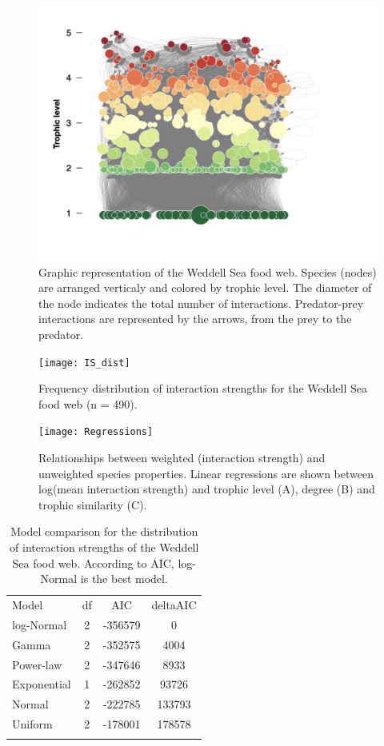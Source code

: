 \documentclass[gc, manuscript]{copernicus}
\begin{document}
\begin{figure}
\includegraphics[width=12cm]{WeddellSea_net} \caption{Graphic representation of the Weddell Sea food web. Species (nodes) are arranged verticaly and colored by trophic level. The diameter of the node indicates the total number of interactions. Predator-prey interactions are represented by the arrows, from the prey to the predator.}\label{fig:unnamed-chunk-3}
\end{figure}

\clearpage

\begin{figure}
\texttt{[image: IS\_dist]} \caption{Frequency distribution of interaction strengths for the Weddell Sea food web (n = 490).}\label{fig:unnamed-chunk-4}
\end{figure}

\clearpage

\begin{figure}
\texttt{[image: Regressions]} \caption{Relationships between weighted (interaction strength) and unweighted species properties. Linear regressions are shown between log(mean interaction strength) and trophic level (A), degree (B) and trophic similarity (C).}\label{fig:unnamed-chunk-5}
\end{figure}

\clearpage

\begin{table}[t]
\caption{Model comparison for the distribution of interaction strengths of the Weddell Sea food web. According to AIC, log-Normal is the best model.}
\begin{tabular}{l c c c}
\tophline

Model & df & AIC & deltaAIC \\
\middlehline
log-Normal & 2 & -356579 & 0 \\
\middlehline
Gamma & 2 & -352575 & 4004 \\
\middlehline
Power-law & 2 & -347646 & 8933 \\
\middlehline
Exponential & 1 & -262852 & 93726 \\
\middlehline
Normal & 2 & -222785 & 133793 \\
\middlehline
Uniform & 2 & -178001 & 178578 \\

\bottomhline
\end{tabular}
\end{table}
\end{document}
